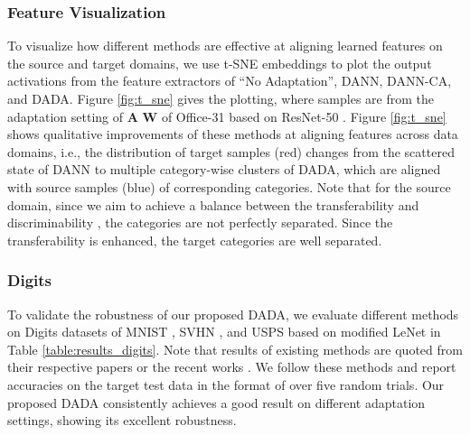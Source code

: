 \documentclass[letterpaper]{article} \usepackage{aaai20}  \usepackage{times}  \usepackage{helvet} \usepackage{courier}  \usepackage[hyphens]{url}  \usepackage{graphicx} \urlstyle{rm} \def\UrlFont{\rm}  \usepackage{graphicx}  \frenchspacing  \setlength{\pdfpagewidth}{8.5in}  \setlength{\pdfpageheight}{11in}
\begin{document}
\subsubsection{Feature Visualization}
To visualize how different methods are effective at aligning learned features on the source and target domains, we use t-SNE embeddings \cite{t_sne} to plot the output activations from the feature extractors of ``No Adaptation'', DANN, DANN-CA, and DADA. Figure \ref{fig:t_sne} gives the plotting, where samples are from the adaptation setting of \textbf{A}  \textbf{W} of Office-31 \cite{office31} based on ResNet-50 \cite{resnet}. Figure \ref{fig:t_sne} shows qualitative improvements of these methods at aligning features across data domains, i.e., the distribution of target samples (red) changes from the scattered state of DANN to multiple category-wise clusters of DADA, which are aligned with source samples (blue) of corresponding categories. Note that for the source domain, since we aim to achieve a balance between the transferability and discriminability \cite{tat}, the categories are not perfectly separated. Since the transferability is enhanced, the target categories are well separated.

\subsubsection{Digits}
To validate the robustness of our proposed DADA, we evaluate different methods on Digits datasets of MNIST \cite{mnist}, SVHN \cite{svhn}, and USPS \cite{usps} based on modified LeNet in Table \ref{table:results_digits}. Note that results of existing methods are quoted from their respective papers or the recent works \cite{adr,mcd}. We follow these methods and report accuracies on the target test data in the format of  over five random trials. Our proposed DADA consistently achieves a good result on different adaptation settings, showing its excellent robustness.
\end{document}
